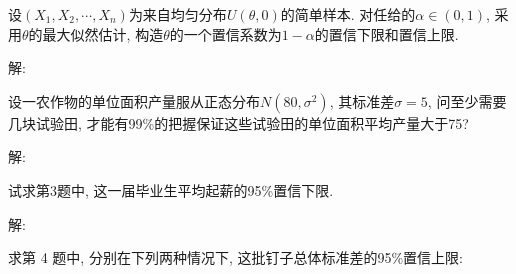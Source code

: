 \documentclass[standard]{ExBook}
\begin{document}
\begin{qitems}
\vspace{-5em}

    \begin{bbox}
    \begin{shaded}
        \qitem
设$(X_1,X_2,\cdots,X_n)$为来自均匀分布$U(\theta,0)$的简单样本. 对任给的$\alpha \in (0,1)$, 采用$\theta$的最大似然估计, 构造$\theta$的一个置信系数为$1-\alpha$的置信下限和置信上限.
    \end{shaded}
    \end{bbox}

\vspace{-5em}

    \begin{bbox}
解: 
    \end{bbox}

\vspace{-5em}

    \begin{bbox}
    \begin{shaded}
        \qitem
设一农作物的单位面积产量服从正态分布$N(80,\sigma^2)$, 其标准差$\sigma=5$, 问至少需要几块试验田, 才能有99\%的把握保证这些试验田的单位面积平均产量大于75?
    \end{shaded}
    \end{bbox}

\vspace{-5em}

    \begin{bbox}
解: 
    \end{bbox}

\vspace{-5em}

    \begin{bbox}
    \begin{shaded}
        \qitem
试求第3题中, 这一届毕业生平均起薪的95\%置信下限.
    \end{shaded}
    \end{bbox}

\vspace{-5em}

    \begin{bbox}
解: 
    \end{bbox}

\vspace{-5em}

    \begin{bbox}
    \begin{shaded}
        \qitem
求第 4 题中, 分别在下列两种情况下, 这批钉子总体标准差的95\%置信上限:


\end{shaded}
\end{bbox}
\end{qitems}
\end{document}
